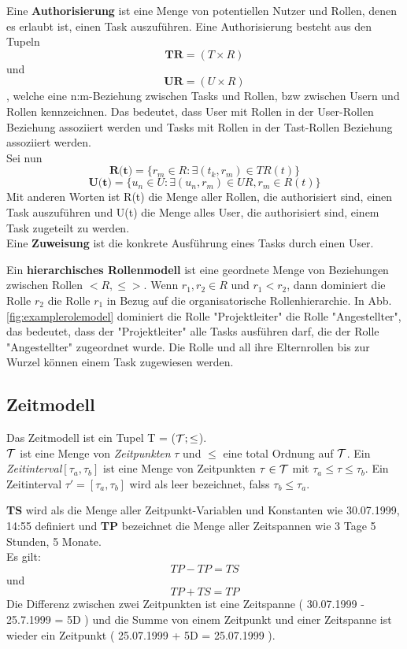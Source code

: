 Eine \textbf{Authorisierung} ist eine Menge von potentiellen Nutzer und Rollen, denen es erlaubt ist, einen Task auszuführen. Eine Authorisierung besteht aus den Tupeln $$\textbf{TR} = (T\times R)$$ und $$\textbf{UR} = (U\times R)$$, welche eine n:m-Beziehung zwischen Tasks und Rollen, bzw zwischen Usern und Rollen kennzeichnen. Das bedeutet, dass User mit Rollen in der User-Rollen Beziehung assoziiert werden und Tasks mit Rollen in der Tast-Rollen Beziehung assoziiert werden.\\
Sei nun $$\textbf{R(t)} = \{r_m \in R: \exists(t_k, r_m) \in TR(t)\}$$
$$\textbf{U(t)} = \{u_n \in U: \exists(u_n, r_m) \in UR, r_m \in R(t)\}$$
Mit anderen Worten ist R(t) die Menge aller Rollen, die authorisiert sind, einen Task auszuführen und U(t) die Menge alles User, die authorisiert sind, einem Task zugeteilt zu werden.\\
Eine \textbf{Zuweisung} ist die konkrete Ausführung eines Tasks durch einen User.

Ein \textbf{hierarchisches Rollenmodell} ist eine geordnete Menge von Beziehungen zwischen Rollen $<R, \leq>$. Wenn $r_1, r_2 \in R$ und $r_1 < r_2$, dann dominiert die Rolle $r_2$ die Rolle $r_1$ in Bezug auf die organisatorische Rollenhierarchie. In Abb. \ref{fig:examplerolemodel} dominiert die Rolle "Projektleiter" die Rolle "Angestellter", das bedeutet, dass der "Projektleiter" alle Tasks ausführen darf, die der Rolle "Angestellter" zugeordnet wurde.
Die Rolle und all ihre Elternrollen bis zur Wurzel können einem Task zugewiesen werden.

\cite{wolter_modeling_of_TBAC_in_BPMN}

\subsection{Zeitmodell}
Das Zeitmodell ist ein Tupel T = ($\mathcal{T};\leq$).\\
$\mathcal{T}$ ist eine Menge von \textit{Zeitpunkten} $\tau$ und $\leq$ eine total Ordnung auf $\mathcal{T}$.
Ein \textit{Zeitinterval}$[\tau_a, \tau_b]$ ist eine Menge von Zeitpunkten $\tau \in \mathcal{T}$ mit $\tau_a \leq \tau \leq \tau_b$.
Ein Zeitinterval $\tau' = [\tau_a, \tau_b]$ wird als leer bezeichnet, falss $\tau_b \leq \tau_a$. \cite{warner_inter_instance}

\textbf{TS} wird als die Menge aller Zeitpunkt-Variablen und Konstanten wie 30.07.1999, 14:55 definiert und \textbf{TP} bezeichnet die Menge aller Zeitspannen wie 3 Tage 5 Stunden, 5 Monate.\\
Es gilt: $$TP - TP = TS$$ und $$TP + TS = TP$$ Die Differenz zwischen zwei Zeitpunkten ist eine Zeitspanne ( 30.07.1999 - 25.7.1999 = 5D ) und die Summe von einem Zeitpunkt und einer Zeitspanne ist wieder ein Zeitpunkt ( 25.07.1999 + 5D = 25.07.1999 ).





